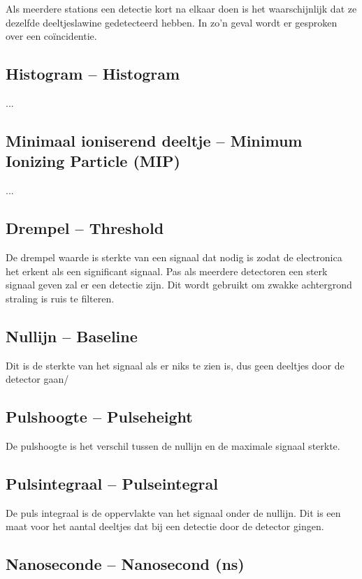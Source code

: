 Als meerdere stations een detectie kort na elkaar doen is het
waarschijnlijk dat ze dezelfde deeltjeslawine gedetecteerd hebben. In
zo'n geval wordt er gesproken over een coïncidentie.


\subsection{Histogram -- Histogram}

...


\subsection{Minimaal ioniserend deeltje -- Minimum Ionizing Particle (MIP)}

...


\subsection{Drempel -- Threshold}

De drempel waarde is sterkte van een signaal dat nodig is zodat de
\hisparc electronica het erkent als een significant signaal. Pas als
meerdere detectoren een sterk signaal geven zal er een detectie zijn.
Dit wordt gebruikt om zwakke achtergrond straling is ruis te filteren.


\subsection{Nullijn -- Baseline}

Dit is de sterkte van het signaal als er niks te zien is, dus geen
deeltjes door de detector gaan/


\subsection{Pulshoogte -- Pulseheight}

De pulshoogte is het verschil tussen de nullijn en de maximale signaal
sterkte.


\subsection{Pulsintegraal -- Pulseintegral}

De puls integraal is de oppervlakte van het signaal onder de nullijn.
Dit is een maat voor het aantal deeltjes dat bij een detectie door de
detector gingen.


\subsection{Nanoseconde -- Nanosecond (ns)}

